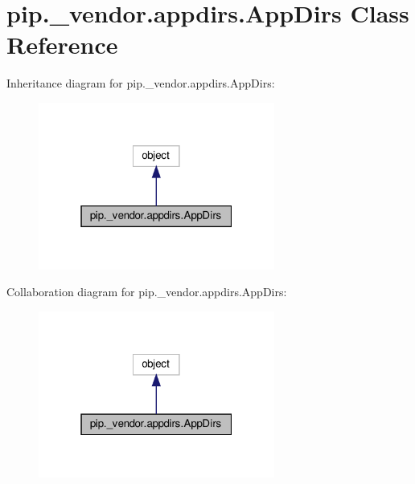 \hypertarget{classpip_1_1__vendor_1_1appdirs_1_1AppDirs}{}\section{pip.\+\_\+vendor.\+appdirs.\+App\+Dirs Class Reference}
\label{classpip_1_1__vendor_1_1appdirs_1_1AppDirs}


Inheritance diagram for pip.\+\_\+vendor.\+appdirs.\+App\+Dirs\+:
\nopagebreak
\begin{figure}[H]
\begin{center}
\leavevmode
\includegraphics[width=220pt]{classpip_1_1__vendor_1_1appdirs_1_1AppDirs__inherit__graph}
\end{center}
\end{figure}


Collaboration diagram for pip.\+\_\+vendor.\+appdirs.\+App\+Dirs\+:
\nopagebreak
\begin{figure}[H]
\begin{center}
\leavevmode
\includegraphics[width=220pt]{classpip_1_1__vendor_1_1appdirs_1_1AppDirs__coll__graph}
\end{center}
\end{figure}
